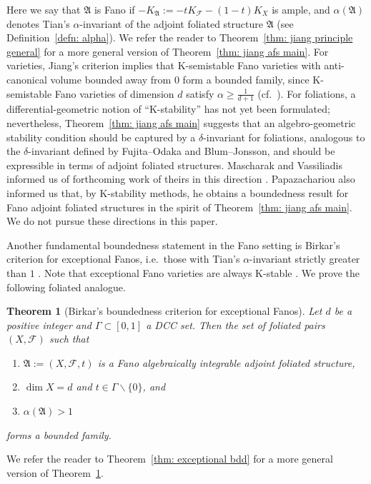 \documentclass[11pt,reqno]{amsart}
\numberwithin{equation}{section}
\newcommand{\Aa}{{\mathfrak{A}}}
\newcommand{\Ff}{\mathcal{F}}
\newcommand{\Ii}{\Gamma}
\newtheorem{alphthm}{Theorem}
\theoremstyle{definition}
\begin{document}
Here we say that $\Aa$ is Fano if $-K_{\Aa}:=-tK_{\Ff}-(1-t)K_X$ is ample, and $\alpha(\Aa)$ denotes Tian's $\alpha$-invariant of the adjoint foliated structure $\Aa$ (see Definition~\ref{defn: alpha}). We refer the reader to Theorem~\ref{thm: jiang principle general} for a more general version of Theorem~\ref{thm: jiang afs main}. For varieties, Jiang's criterion implies that K-semistable Fano varieties with anti-canonical volume bounded away from $0$ form a bounded family, since K-semistable Fano varieties of dimension $d$ satisfy $\alpha\geq\frac{1}{d+1}$ (cf.~\cite[Theorem~3.5]{FO18}). For foliations, a differential-geometric notion of ``K-stability'' has not yet been formulated; nevertheless, Theorem~\ref{thm: jiang afs main} suggests that an algebro-geometric stability condition should be captured by a $\delta$-invariant for foliations, analogous to the $\delta$-invariant \cite{FO18,BJ20} defined by Fujita--Odaka and Blum--Jonsson, and should be expressible in terms of adjoint foliated structures. Mascharak and Vassiliadis informed us of forthcoming work of theirs in this direction \cite{MV26}. Papazachariou \cite{Pap26} also informed us that, by K-stability methods, he obtains a boundedness result for Fano adjoint foliated structures in the spirit of Theorem~\ref{thm: jiang afs main}. We do not pursue these directions in this paper.


Another fundamental boundedness statement in the Fano setting is Birkar's criterion for exceptional Fanos, i.e.\ those with Tian's $\alpha$-invariant strictly greater than $1$ \cite[Theorem~1.11]{Bir19}. Note that exceptional Fano varieties are always K-stable \cite{Tia87,OS12}. We prove the following foliated analogue.

\begin{alphthm}[Birkar's boundedness criterion for exceptional Fanos]\label{thm: exceptional afs main}
Let $d$ be a positive integer and $\Ii\subset [0,1]$ a DCC set. Then the set of foliated pairs $(X,\Ff)$ such that
\begin{enumerate}
    \item $\Aa:=(X,\Ff,t)$ is a Fano algebraically integrable adjoint foliated structure,
    \item $\dim X=d$ and $t\in\Ii\backslash\{0\}$, and
    \item $\alpha(\Aa)>1$
\end{enumerate}
forms a bounded family.
\end{alphthm}

We refer the reader to Theorem~\ref{thm: exceptional bdd} for a more general version of Theorem~\ref{thm: exceptional afs main}.
\end{document}
